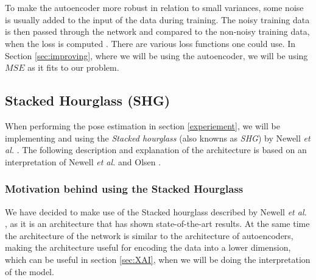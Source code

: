 \documentclass[./main.tex]{subfiles}
\begin{document}
\\
\\
To make the autoencoder more robust in relation to small variances, some noise is usually added to the input of the data during training. The noisy training data is then passed through the network and compared to the non-noisy training data, when the loss is computed \cite{DeepLearning}. There are various loss functions one could use. In Section \ref{sec:improving}, where we will be using the autoencoder, we will be using $MSE$ as it fits to our problem.

\subsection{Stacked Hourglass (SHG)}\label{subsec:SHG}
When performing the pose estimation in section \ref{experiement}, we will be implementing and using the \textit{Stacked hourglass} (also knowns as \textit{SHG}) by Newell \textit{et al.} \cite{Newell}. The following description and explanation of the architecture is based on an interpretation of Newell \textit{et al.} \cite{Newell} and Olsen \cite{Camilla}.

\subsubsection{Motivation behind using the Stacked Hourglass}\label{subsec:reasoning}
We have decided to make use of the Stacked hourglass described by Newell \textit{et al.} \cite{Newell}, as it is an architecture that has shown state-of-the-art results. At the same time the architecture of the network is similar to the architecture of autoencoders, making the architecture useful for encoding the data into a lower dimension, which can be useful in section \ref{sec:XAI}, when we will be doing the interpretation of the model.
\end{document}
